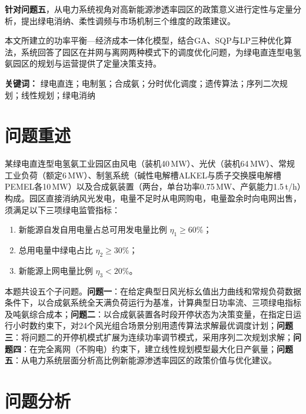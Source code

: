 \documentclass[UTF8,12pt,a4paper]{ctexart}
\begin{document}
\textbf{针对问题五}，从电力系统视角对高新能源渗透率园区的政策意义进行定性与定量分析，提出绿电消纳、柔性调频与市场机制三个维度的政策建议。

本文所建立的功率平衡—经济成本一体化模型，结合GA、SQP与LP三种优化算法，系统回答了园区在并网与离网两种模式下的调度优化问题，为绿电直连型电氢氨园区的规划与运营提供了定量决策支持。

\vspace{0.5em}
\noindent\textbf{关键词：}
绿电直连；电制氢；合成氨；分时优化调度；遗传算法；序列二次规划；线性规划；绿电消纳

\newpage

\section{问题重述}

某绿电直连型电氢氨工业园区由风电（装机40\,MW）、光伏（装机64\,MW）、常规工业负荷（额定6\,MW）、制氢系统（碱性电解槽ALKEL与质子交换膜电解槽PEMEL各10\,MW）以及合成氨装置（两台，单台功率0.75\,MW、产氨能力1.5\,t/h）构成。园区直接消纳风光发电，电量不足时从电网购电，电量盈余时向电网出售，须满足以下三项绿电监管指标：
\begin{enumerate}[label=(\arabic*), leftmargin=3em]
  \item 新能源自发自用电量占总可用发电量比例 $\eta_1 \geq 60\%$；
  \item 总用电量中绿电占比 $\eta_2 \geq 30\%$；
  \item 新能源上网电量比例 $\eta_3 < 20\%$。
\end{enumerate}

本题共设五个子问题。\textbf{问题一}：在给定典型日风光标幺值出力曲线和常规负荷数据条件下，以合成氨系统全天满负荷运行为基准，计算典型日功率流、三项绿电指标及吨氨综合成本；\textbf{问题二}：以合成氨装置各时段开停状态为决策变量，在指定日运行小时数约束下，对24个风光组合场景分别用遗传算法求解最优调度计划；\textbf{问题三}：将问题二的开停机模式扩展为连续功率调节模式，采用序列二次规划求解；\textbf{问题四}：在完全离网（不购电）约束下，建立线性规划模型最大化日产氨量；\textbf{问题五}：从电力系统层面分析高比例新能源渗透率园区的政策价值与优化建议。

\section{问题分析}
\end{document}
